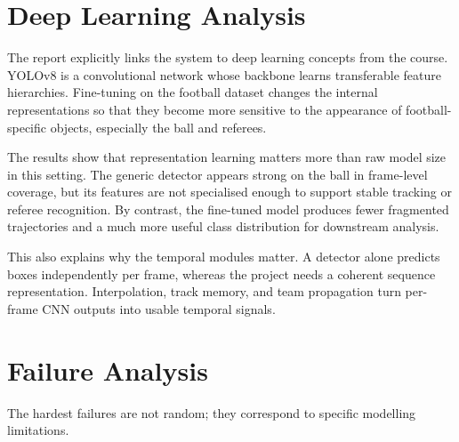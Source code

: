 \documentclass[11pt,a4paper]{article}
\begin{document}
\section{Deep Learning Analysis}
The report explicitly links the system to deep learning concepts from the course. YOLOv8 is a convolutional network whose backbone learns transferable feature hierarchies. Fine-tuning on the football dataset changes the internal representations so that they become more sensitive to the appearance of football-specific objects, especially the ball and referees.

The results show that representation learning matters more than raw model size in this setting. The generic detector appears strong on the ball in frame-level coverage, but its features are not specialised enough to support stable tracking or referee recognition. By contrast, the fine-tuned model produces fewer fragmented trajectories and a much more useful class distribution for downstream analysis.

This also explains why the temporal modules matter. A detector alone predicts boxes independently per frame, whereas the project needs a coherent sequence representation. Interpolation, track memory, and team propagation turn per-frame CNN outputs into usable temporal signals.

\section{Failure Analysis}
The hardest failures are not random; they correspond to specific modelling limitations.

\begin{table}[H]
\centering
\caption{Failure modes and technical causes.}
\end{table}
\end{document}
